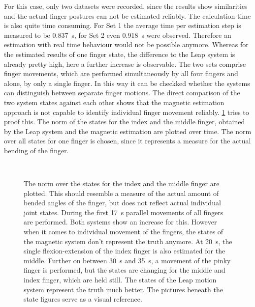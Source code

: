 For this case, only two datasets were recorded, since the results show similarities and the actual finger postures can not be estimated reliably. The calculation time is also quite time consuming. For Set 1 the average time per estimation step is measured to be \SI{0.837}{\second}, for Set 2 even \SI{0.918}{\second} were observed. Therefore an estimation with real time behaviour would not be possible anymore. Whereas for the estimated results of one finger state, the difference to the Leap system is already pretty high, here a further increase is observable. The two sets comprise finger movements, which are performed simultaneously by all four fingers and alone, by only a single finger. In this way it can be checkked whether the systems can distinguish between separate finger motions. The direct comparison of the two system states against each other shows that the magnetic estimation approach is not capable to identify individual finger movement reliably. \ref{fig:est44} tries to proof this. The norm of the states for the index and the middle finger, obtained by the Leap system and the magnetic estimation are plotted over time. The norm over all states for one finger is chosen, since it represents a measure for the actual bending of the finger. 
\begin{figure}
\centering
{}\\
\caption[Estimating the motion of four fingers]
{The norm over the states for the index and the middle finger are plotted. This should resemble a measure of the actual amount of bended angles of the finger, but does not reflect actual individual joint states. During the first \SI{17}{\second} parallel movements of all fingers are performed. Both systems show an increase for this. However when it comes to individual movement of the fingers, the states of the magnetic system don't represent the truth anymore. At \SI{20}{\second}, the single flexion-extension of the index finger is also estimated for the middle. Further on between \SI{30}{\second} and \SI{35}{\second}, a movement of the pinky finger is performed, but the states are changing for the middle and index finger, which are held still. The states of the Leap motion system represent the truth much better. The pictures beneath the state figures serve as a visual reference.}
\label{fig:est44}
\end{figure}
